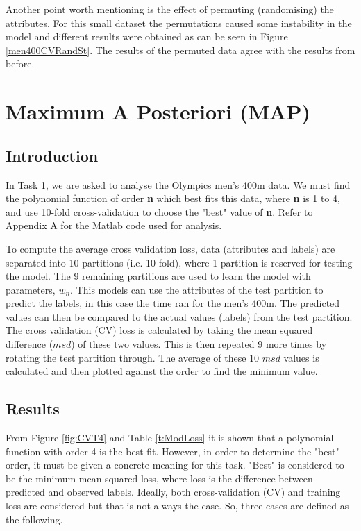 {Another point worth mentioning is the effect of permuting (randomising) the attributes. For this small dataset the permutations caused some instability in the model and different results were obtained as can be seen in Figure \ref{men400CVRandSt}. The results of the permuted data agree with the results from before.

\newpage
\section{Maximum A Posteriori (MAP)}{\label{s1}
	
	\subsection{Introduction}\label{Int}
	In Task 1, we are asked to analyse the Olympics men's 400m data. We must find the polynomial function of order \textbf{n} which best fits this data, where \textbf{n} is 1 to 4, and use 10-fold cross-validation to choose the "best" value of \textbf{n}. Refer to Appendix A for the Matlab code used for analysis.
	
	To compute the average cross validation loss, data (attributes and labels) are separated into 10 partitions (i.e. 10-fold), where 1 partition is reserved for testing the model. The 9 remaining partitions are used to learn the model with parameters, $w_{n}$. This models can use the attributes of the test partition to predict the labels, in this case the time ran for the men's 400m. The predicted values can then be compared to the actual values (labels)  from the test partition. The cross validation (CV) loss is calculated by taking the mean squared difference ($msd$) of these two values. This is then repeated 9 more times by rotating the test partition through. The average of these 10 $msd$ values is calculated and then plotted against the order to find the minimum value.
	
	\subsection{Results}\label{CVcons}
	From Figure \ref{fig:CVT4} and Table \ref{t:ModLoss} it is shown that a polynomial function with order 4 is the best fit. However, in order to determine the "best" order, it must be given a concrete meaning for this task. "Best" is considered to be the minimum mean squared loss, where loss is the difference between predicted and observed labels. Ideally, both cross-validation (CV) and training loss are considered but that is not always the case. So, three cases are defined as the following.
	
}}
